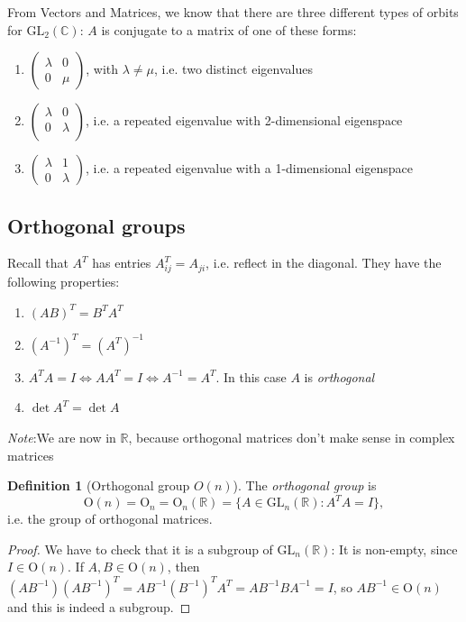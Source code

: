 \documentclass[a4paper]{article}
\theoremstyle{definition}
\newtheorem*{defi}{Definition}
\newcommand{\note}{\noindent \emph{Note}:\;}
\newcommand{\R}{\mathbb{R}}
\newcommand{\C}{\mathbb{C}}
\newcommand{\GL}{\mathrm{GL}}
\newcommand{\Or}{\mathrm{O}}
\begin{document}
From Vectors and Matrices, we know that there are three different types of orbits for $\GL_2(\C)$: $A$ is conjugate to a matrix of one of these forms:
\begin{enumerate}
\item $
\begin{pmatrix}
  \lambda & 0\\
  0 & \mu
\end{pmatrix}
$, with $\lambda \not= \mu$, i.e. two distinct eigenvalues
\item $
  \begin{pmatrix}
    \lambda & 0\\
    0 & \lambda\\
  \end{pmatrix}$, i.e. a repeated eigenvalue with 2-dimensional eigenspace
\item $
  \begin{pmatrix}
    \lambda & 1\\
    0 & \lambda
  \end{pmatrix}$, i.e. a repeated eigenvalue with a 1-dimensional eigenspace
\end{enumerate}
\subsection{Orthogonal groups}
Recall that $A^T$ has entries $A^{T}_{ij} = A_{ji}$, i.e. reflect in the diagonal. They have the following properties:
\begin{enumerate}
\item $(AB)^T = B^TA^T$
\item $(A^{-1})^T = (A^T)^{-1}$
\item $A^{T}A = I\Leftrightarrow AA^{T} = I\Leftrightarrow A^{-1} = A^{T}$. In this case $A$ is \emph{orthogonal}
\item $\det A^{T} = \det A$
\end{enumerate}
\note We are now in $\R$, because orthogonal matrices don't make sense in complex matrices

\begin{defi}[Orthogonal group $O(n)$]
  The \emph{orthogonal group} is 
  \[
  \Or(n) = \Or_n = \Or_n(\R) = \{A\in \GL_n(\R): A^TA = I\},
  \]
i.e. the group of orthogonal matrices.
\end{defi}

\begin{proof}
  We have to check that it is a subgroup of $\GL_n(\R)$: It is non-empty, since $I\in \Or(n)$. If $A, B\in \Or(n)$, then $(AB^{-1})(AB^{-1})^T = AB^{-1}(B^{-1})^TA^{T} = AB^{-1}BA^{-1} = I$, so $AB^{-1}\in \Or(n)$ and this is indeed a subgroup.
\end{proof}
\end{document}
